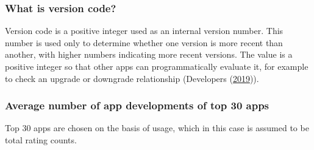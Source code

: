 \documentclass[
]{article}
\begin{document}
\hypertarget{what-is-version-code}{%
\subsubsection{What is version code?}\label{what-is-version-code}}

Version code is a positive integer used as an internal version number. This number is used only to determine whether one version is more recent than another, with higher numbers indicating more recent versions. The value is a positive integer so that other apps can programmatically evaluate it, for example to check an upgrade or downgrade relationship (Developers (\protect\hyperlink{ref-version_code}{2019})).

\hypertarget{average-number-of-app-developments-of-top-30-apps}{%
\subsubsection{Average number of app developments of top 30 apps}\label{average-number-of-app-developments-of-top-30-apps}}

Top 30 apps are chosen on the basis of usage, which in this case is assumed to be total rating counts.
\end{document}
